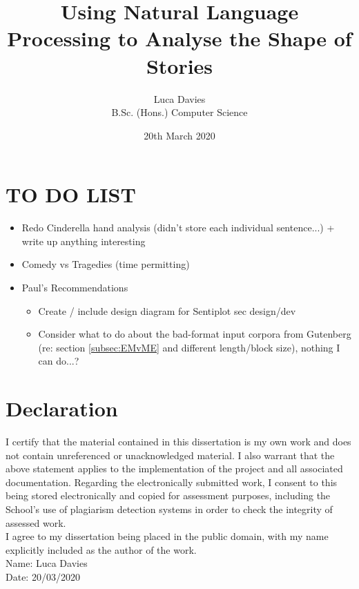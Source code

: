\documentclass{article}
\title{\textbf{Using Natural Language Processing to Analyse the Shape of Stories}}
\author{
Luca Davies \\ B.Sc. (Hons.) Computer Science}
\date{20th March 2020}
\begin{document}
\maketitle
\newpage
\section*{TO DO LIST}
    \begin{itemize} 
        \item Redo Cinderella hand analysis (didn't store each individual sentence...) + write up anything interesting
        \item Comedy vs Tragedies (time permitting)
        \item Paul's Recommendations
            \begin{itemize}
                \item Create / include design diagram for Sentiplot sec design/dev
                \item Consider what to do about the bad-format input corpora from Gutenberg (re: section \ref{subsec:EMvME} and different length/block size), nothing I can do...?
            \end{itemize}
    \end{itemize}

\section*{Declaration}
    I certify that the material contained in this dissertation is my own work and does not contain unreferenced or unacknowledged material. I also warrant that the above statement applies to the implementation of the project and all associated documentation. Regarding the electronically submitted work, I consent to this being stored electronically and copied for assessment purposes, including the School’s use of plagiarism detection systems in order to check the integrity of assessed work. \\
    I agree to my dissertation being placed in the public domain, with my name explicitly included as the author of the work. \\
    
    \noindent
    Name: Luca Davies\\
    Date: 20/03/2020
\newpage
\end{document}
